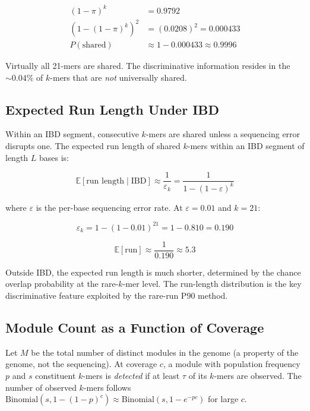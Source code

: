 \documentclass{../yalumba}
\begin{document}
\begin{align}
  (1 - \pi)^k &= 0.9792 \nonumber \\
  (1 - (1-\pi)^k)^2 &= (0.0208)^2 = 0.000433 \nonumber \\
  P(\text{shared}) &\approx 1 - 0.000433 \approx 0.9996
  \label{eq:sharing_numeric}
\end{align}

Virtually all 21-mers are shared.  The discriminative information
resides in the ${\sim}0.04\%$ of $k$-mers that are \emph{not}
universally shared.

\subsection{Expected Run Length Under IBD}
\label{sec:math:runlength}

Within an IBD segment, consecutive $k$-mers are shared unless a
sequencing error disrupts one.  The expected run length of shared
$k$-mers within an IBD segment of length $L$ bases is:

\begin{equation}
  \mathbb{E}[\text{run length} \mid \text{IBD}]
  \approx \frac{1}{\varepsilon_k} = \frac{1}{1 - (1-\varepsilon)^k}
  \label{eq:expected_run_ibd}
\end{equation}

where $\varepsilon$ is the per-base sequencing error rate.  At
$\varepsilon = 0.01$ and $k = 21$:

\begin{equation}
  \varepsilon_k = 1 - (1 - 0.01)^{21} = 1 - 0.810 = 0.190
  \label{eq:error_k}
\end{equation}

\begin{equation}
  \mathbb{E}[\text{run}] \approx \frac{1}{0.190} \approx 5.3
  \label{eq:expected_run_numeric}
\end{equation}

Outside IBD, the expected run length is much shorter, determined by
the chance overlap probability at the rare-$k$-mer level.  The run-length
distribution is the key discriminative feature exploited by the
rare-run P90 method.

\subsection{Module Count as a Function of Coverage}
\label{sec:math:modules}

Let $M$ be the total number of distinct modules in the genome (a
property of the genome, not the sequencing).  At coverage $c$, a module
with population frequency $p$ and $s$ constituent $k$-mers is
\emph{detected} if at least $\tau$ of its $k$-mers are observed.  The
number of observed $k$-mers follows $\mathrm{Binomial}(s, 1 -
(1 - p)^c) \approx \mathrm{Binomial}(s, 1 - e^{-pc})$ for large $c$.
\end{document}
